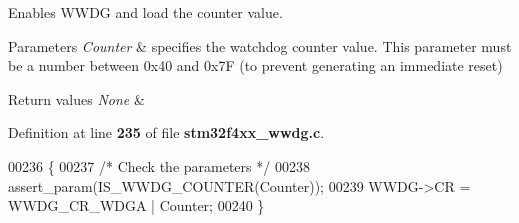 Enables W\+W\+DG and load the counter value. 


\begin{DoxyParams}{Parameters}
{\em Counter} & specifies the watchdog counter value. This parameter must be a number between 0x40 and 0x7F (to prevent generating an immediate reset) \\
\hline
\end{DoxyParams}

\begin{DoxyRetVals}{Return values}
{\em None} & \\
\hline
\end{DoxyRetVals}


Definition at line \textbf{ 235} of file \textbf{ stm32f4xx\+\_\+wwdg.\+c}.


\begin{DoxyCode}
00236 \{
00237   \textcolor{comment}{/* Check the parameters */}
00238   assert_param(IS_WWDG_COUNTER(Counter));
00239   WWDG->CR = WWDG_CR_WDGA | Counter;
00240 \}
\end{DoxyCode}
